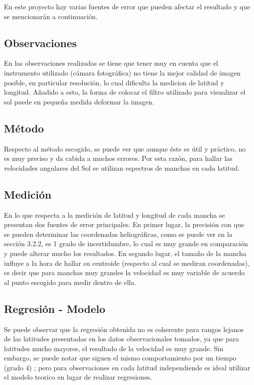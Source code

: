 \documentclass[11pt,letterpaper]{article}
\begin{document}
En este proyecto hay varias fuentes de error que pueden afectar el resultado y que se mencionarán a continuación.
\\

\subsection{Observaciones}
En las observaciones realizadas se tiene que tener muy en cuenta que el instrumento utilizado (cámara fotográfica) no tiene la mejor calidad de imagen posible, en particular resolución, lo cual dificulta la medicion de latitud y longitud. Añadido a esto, la forma de colocar el filtro utilizado para visualizar el sol puede en pequeña medida deformar la imagen.
\\

\subsection{Método}
Respecto al método escogido, se puede ver que aunque éste es útil y práctico, no es muy preciso y da cabida a muchos errores. Por esta razón, para hallar las velocidades angulares del Sol se utilizan espectros de manchas en cada latitud.
\\

\subsection{Medición}
En lo que respecta a la medición de latitud y longitud de cada mancha se presentan dos fuentes de error principales. En primer lugar, la precisión con que se pueden determinar las coordenadas heliográficas, como se puede ver en la sección 3.2.2, es 1 grado de incertidumbre, lo cual es muy grande en comparación y puede alterar mucho los resultados. En segundo lugar, el tamaño de la mancha influye a la hora de hallar su centroide (respecto al cual se mediran coordenadas), es decir que para manchas muy grandes la velocidad es muy variable de acuerdo al punto escogido para medir dentro de ella.
\\

\subsection{Regresión - Modelo}
Se puede observar que la regresión obtenida no es coherente para rangos lejanos de las latitudes presentadas en los datos observacionales tomados, ya que para latitudes mucho mayores, el resultado de la velocidad es muy grande. Sin embargo, se puede notar que siguen el mismo comportamiento por un tiempo (grado 4) ; pero para observaciones en cada latitud independiende es ideal utilizar el modelo teorico en lugar de realizar regresiones.
\\
\end{document}
